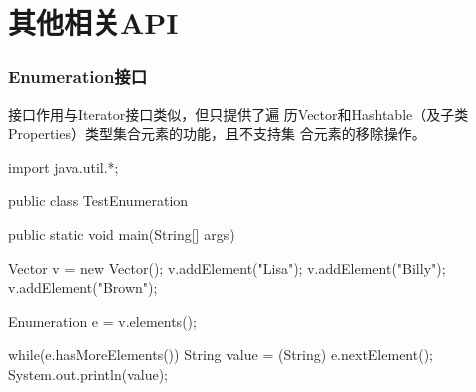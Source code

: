 
\section{其他相关API}
\begin{frame}[fragile] %
  \frametitle{Enumeration接口}

   接口作用与Iterator接口类似，但只提供了遍
  历Vector和Hashtable（及子类Properties）类型集合元素的功能，且不支持集
  合元素的移除操作。

  \begin{javaCode}
    import java.util.*;

    public class TestEnumeration {
      public static void main(String[] args) {
        Vector v = new Vector();
        v.addElement("Lisa");
        v.addElement("Billy");
        v.addElement("Brown");

        Enumeration e = v.elements();

        while(e.hasMoreElements()) {
          String value = (String) e.nextElement();
          System.out.println(value);
        }
      }
    }
  \end{javaCode}
\end{frame}

